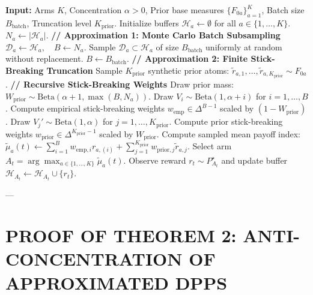 \documentclass[twoside]{article}
\begin{document}
\begin{algorithm}[h]
\caption{Approximated DPPS for Multi-Armed Bandits}
\label{alg:approximated_dpps}
\begin{algorithmic}[1]
\State \textbf{Input:} Arms $K$, Concentration $\alpha > 0$, Prior base measures $\{F_{0a}\}_{a=1}^K$, Batch size $B_{\text{batch}}$, Truncation level $K_{\text{prior}}$.
\State Initialize buffers $\mathcal{H}_{a} \leftarrow \emptyset$ for all $a \in \{1, \dots, K\}$.
        \State $N_a \leftarrow |\mathcal{H}_a|$.
        \State \textbf{// Approximation 1: Monte Carlo Batch Subsampling}
            \State $\mathcal{D}_a \leftarrow \mathcal{H}_a, \quad B \leftarrow N_a$.
        \Else
            \State Sample $\mathcal{D}_a \subset \mathcal{H}_a$ of size $B_{\text{batch}}$ uniformly at random without replacement.
            \State $B \leftarrow B_{\text{batch}}$.
        \EndIf
        \State \textbf{// Approximation 2: Finite Stick-Breaking Truncation}
        \State Sample $K_{\text{prior}}$ synthetic prior atoms: $\tilde{r}_{a, 1}, \dots, \tilde{r}_{a, K_{\text{prior}}} \sim F_{0a}$.
        \State \textbf{// Recursive Stick-Breaking Weights \citep{vashishtha2025leveraging}}
        \State Draw prior mass: $W_{\text{prior}} \sim \text{Beta}(\alpha + 1, \max(B, N_a))$.
            \State Draw $V_i \sim \text{Beta}(1, \alpha + i)$ for $i = 1, \dots, B$.
            \State Compute empirical stick-breaking weights $w_{\text{emp}} \in \Delta^{B-1}$ scaled by $(1 - W_{\text{prior}})$.
        \EndIf
        \State Draw $V_j' \sim \text{Beta}(1, \alpha)$ for $j = 1, \dots, K_{\text{prior}}$.
        \State Compute prior stick-breaking weights $w_{\text{prior}} \in \Delta^{K_{\text{prior}}-1}$ scaled by $W_{\text{prior}}$.
        \State Compute sampled mean payoff index:
        \State $\tilde{\mu}_a(t) \leftarrow \sum_{i=1}^B w_{\text{emp}, i} r_{a, (i)} + \sum_{j=1}^{K_{\text{prior}}} w_{\text{prior}, j} \tilde{r}_{a, j}$.
    \EndFor
    \State Select arm $A_t = \arg\max_{a \in \{1, \dots, K\}} \tilde{\mu}_a(t)$.
    \State Observe reward $r_t \sim P^\star_{A_t}$ and update buffer $\mathcal{H}_{A_t} \leftarrow \mathcal{H}_{A_t} \cup \{r_t\}$.
\EndFor
\end{algorithmic}
\end{algorithm}

---

\section{PROOF OF THEOREM 2: ANTI-CONCENTRATION OF APPROXIMATED DPPS}
\label{app:proof_thm2}
\end{document}
